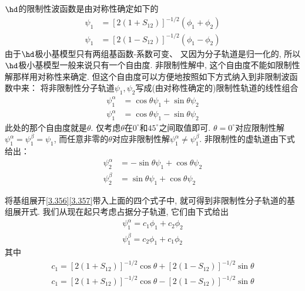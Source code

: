 $\hd$的限制性波函数是由对称性确定如下的
\begin{align}
	\psi_1 &= [2(1+S_{12} )]^{-1/2}(\phi_1+\phi_2)
	\label{3.356}
	\\
	\psi_1 &= [2(1-S_{12})]^{-1/2}(\phi_1-\phi_2)
	\label{3.357}
\end{align}
由于$\hd$极小基模型只有两组基函数-系数可变、
又因为分子轨道是归一化的, 
所以$\hd$极小基模型一般来说只有一个自由度. 
非限制性解中, 
这个自由度不能如限制性解那样用对称性来确定. 
但这个自由度可以方便地按照如下方式纳入到非限制波函数中来：
将非限制性分子轨道$\psi_1,\psi_2$写成(由对称性确定的)限制性轨道的线性组合
\begin{align}\label{3.358}
	\psi_1^\alpha &= \cos\theta \psi_1 + \sin\theta \psi_2 \\
	\psi_1^\alpha &= \cos\theta \psi_1 - \sin\theta \psi_2 \label{3.359}
\end{align}
此处的那个自由度就是$\theta$.  
仅考虑$\theta$在$0^\circ$和$45^\circ$之间取值即可. 
$\theta=0^\circ$对应限制性解$\psi_1^\alpha=\psi_1^\beta=\psi_1$, 
而任意非零的$\theta$对应非限制性解$\psi_1^\alpha \neq \psi_1^\beta$. 
非限制性的虚轨道由下式给出：
\begin{align}
	\psi_2^\alpha &= - \sin\theta \psi_1 + \cos\theta \psi_2 \label{3.360}\\
	\psi_2^\beta &=  \sin\theta \psi_1 + \cos\theta \psi_2 \label{3.361}
\end{align}

将基组展开\autoref{3.356}\autoref{3.357}带入上面的四个式子中, 
就可得到非限制性分子轨道的基组展开式. 
我们从现在起只考虑占据分子轨道, 
它们由下式给出
\begin{align}
	\psi_1^\alpha = c_1\phi_1 + c_2\phi_2 \label{3.362}\\
	\psi_1^\beta = c_2\phi_1 + c_1\phi_2 \label{3.363}
\end{align}
其中
\begin{align}
	c_1 = [2(1+S_{12} )]^{-1/2}\cos\theta + [2(1 - S_{12} )]^{-1/2}\sin\theta\\
	c_1 = [2(1+S_{12} )]^{-1/2}\cos\theta - [2(1 - S_{12} )]^{-1/2}\sin\theta
\end{align}

